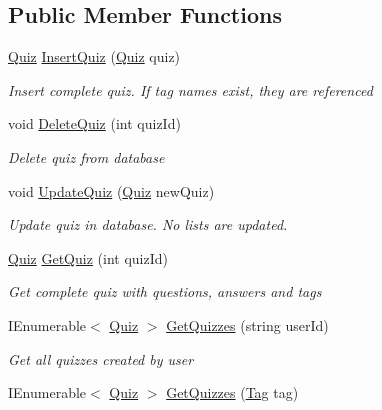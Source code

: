 \subsection*{Public Member Functions}
\begin{DoxyCompactItemize}
\item 
\hyperlink{class_website_1_1_models_1_1_quiz}{Quiz} \hyperlink{class_website_1_1_models_1_1_d_a_l_e_f_ac6fd9594d6355591c4524e65d3ee7f0f}{Insert\+Quiz} (\hyperlink{class_website_1_1_models_1_1_quiz}{Quiz} quiz)
\begin{DoxyCompactList}\small\item\em Insert complete quiz. If tag names exist, they are referenced \end{DoxyCompactList}\item 
void \hyperlink{class_website_1_1_models_1_1_d_a_l_e_f_aec315fcdbd445cdda9ba192bd1558482}{Delete\+Quiz} (int quiz\+Id)
\begin{DoxyCompactList}\small\item\em Delete quiz from database \end{DoxyCompactList}\item 
void \hyperlink{class_website_1_1_models_1_1_d_a_l_e_f_a9096cf2dbc8708b02e50220c238fadd0}{Update\+Quiz} (\hyperlink{class_website_1_1_models_1_1_quiz}{Quiz} new\+Quiz)
\begin{DoxyCompactList}\small\item\em Update quiz in database. No lists are updated. \end{DoxyCompactList}\item 
\hyperlink{class_website_1_1_models_1_1_quiz}{Quiz} \hyperlink{class_website_1_1_models_1_1_d_a_l_e_f_aa5a53473fc634b488c6ad9f92ba15e56}{Get\+Quiz} (int quiz\+Id)
\begin{DoxyCompactList}\small\item\em Get complete quiz with questions, answers and tags \end{DoxyCompactList}\item 
I\+Enumerable$<$ \hyperlink{class_website_1_1_models_1_1_quiz}{Quiz} $>$ \hyperlink{class_website_1_1_models_1_1_d_a_l_e_f_ad08b5311f5e952cc03a688675d510e5d}{Get\+Quizzes} (string user\+Id)
\begin{DoxyCompactList}\small\item\em Get all quizzes created by user \end{DoxyCompactList}\item 
I\+Enumerable$<$ \hyperlink{class_website_1_1_models_1_1_quiz}{Quiz} $>$ \hyperlink{class_website_1_1_models_1_1_d_a_l_e_f_a89931cf749dd998a66eba5b2ea4b17d1}{Get\+Quizzes} (\hyperlink{class_website_1_1_models_1_1_tag}{Tag} tag)

\end{DoxyCompactItemize}

